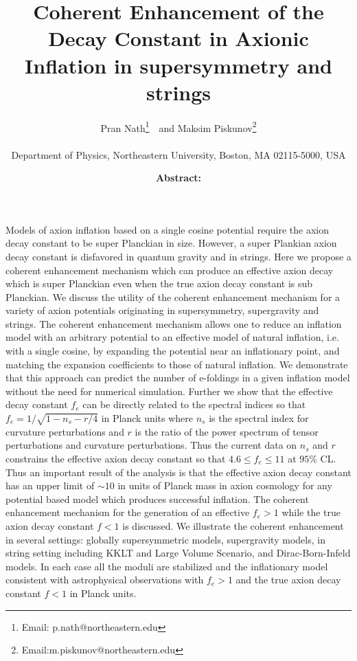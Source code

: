 \documentclass[12pt]{article}
\author{
Pran Nath\footnote{Email: p.nath@northeastern.edu}~\ and 
Maksim Piskunov\footnote{Email:m.piskunov@northeastern.edu}\\~\\
Department of Physics, Northeastern University,
Boston, MA 02115-5000, USA
}
\title{Coherent Enhancement 
 of the Decay Constant in Axionic Inflation
 in supersymmetry and strings}
\begin{document}
\maketitle
\date

\textbf{Abstract: }
Models of axion inflation based on a  single cosine potential require the axion decay constant to be super Planckian in size. However, a super Plankian axion
decay constant is disfavored in quantum gravity and in strings. Here we propose a coherent enhancement mechanism which can produce an
effective axion decay which is super Planckian even when the true axion decay constant is sub Planckian.  We discuss the utility of the coherent
enhancement mechanism for a variety of axion potentials originating in supersymmetry, supergravity and strings.  The coherent
enhancement mechanism allows one  to reduce an inflation model with an arbitrary potential to an effective model of natural inflation, i.e. with a single cosine, by expanding the potential near an inflationary point, and matching the expansion coefficients to those of natural inflation. We demonstrate that this approach can predict the number of e-foldings in a given inflation model without the need for numerical simulation. Further we show that  the effective decay constant $f_e$ can be directly related to the spectral indices so that
$f_e=  1/\sqrt{1-n_s-r/4}$ in Planck units where $n_s$ is the spectral index for curvature perturbations and $r$ is the ratio of
the power spectrum of tensor perturbations and curvature perturbations. Thus the current data on $n_s$ and $r$ constrains the effective
axion decay constant so that   $4.6 \leq f_e\leq 11$ at $95\%$ CL.
Thus an important result of the analysis is that the effective axion decay constant has an upper limit
of $\sim 10$ in units of Planck mass in axion cosmology for any potential based model which produces successful inflation.
The coherent enhancement  mechanism for the generation of an effective $f_e >1$ while the true axion decay constant $f<1$ is
discussed.
We illustrate the coherent enhancement in several settings:  globally supersymmetric models, supergravity models,
in string setting including KKLT and Large Volume Scenario, and
Dirac-Born-Infeld models.
In each case all the moduli are stabilized and
the inflationary model consistent with astrophysical observations with $f_e>1$ and  the true axion decay constant
$f<1$ in Planck units.
\newpage
\end{document}
